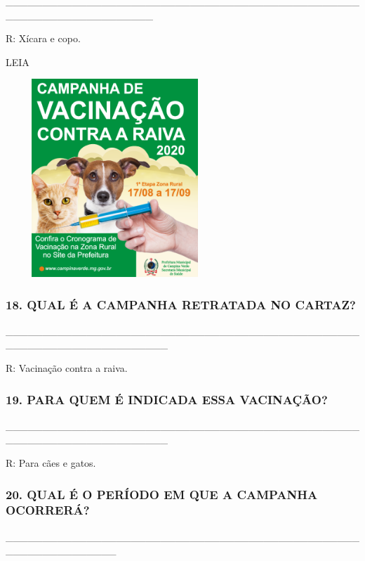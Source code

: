 \_\_\_\_\_\_\_\_\_\_\_\_\_\_\_\_\_\_\_\_\_\_\_\_\_\_\_\_\_\_\_\_\_\_\_\_\_\_\_\_\_\_\_\_\_\_\_\_\_\_\_\_\_\_\_\_\_\_\_\_\_\_\_\_\_\_\_\_

R: Xícara e copo.

LEIA

\includegraphics[width=3.23444in,height=2.93410in]{media/image131.png}

\subsubsection{18. QUAL É A CAMPANHA RETRATADA NO
CARTAZ?}\label{qual-uxe9-a-campanha-mostrada-no-cartaz}

\_\_\_\_\_\_\_\_\_\_\_\_\_\_\_\_\_\_\_\_\_\_\_\_\_\_\_\_\_\_\_\_\_\_\_\_\_\_\_\_\_\_\_\_\_\_\_\_\_\_\_\_\_\_\_\_\_\_\_\_\_\_\_\_\_\_\_\_\_\_

R: Vacinação contra a raiva.

\subsubsection{19. PARA QUEM É INDICADA ESSA
VACINAÇÃO?}\label{para-quem-uxe9-indicada-essa-vacinauxe7uxe3o}

\_\_\_\_\_\_\_\_\_\_\_\_\_\_\_\_\_\_\_\_\_\_\_\_\_\_\_\_\_\_\_\_\_\_\_\_\_\_\_\_\_\_\_\_\_\_\_\_\_\_\_\_\_\_\_\_\_\_\_\_\_\_\_\_\_\_\_\_\_\_

R: Para cães e gatos.\protect\hypertarget{_heading=h.81uy4mz4w5m6}{}{}

\subsubsection{20. QUAL É O PERÍODO EM QUE A
CAMPANHA OCORRERÁ?}\label{qual-o-peruxedodo-que-vai-acontecer-a-campanha}

\_\_\_\_\_\_\_\_\_\_\_\_\_\_\_\_\_\_\_\_\_\_\_\_\_\_\_\_\_\_\_\_\_\_\_\_\_\_\_\_\_\_\_\_\_\_\_\_\_\_\_\_\_\_\_\_\_\_\_\_\_\_\_

